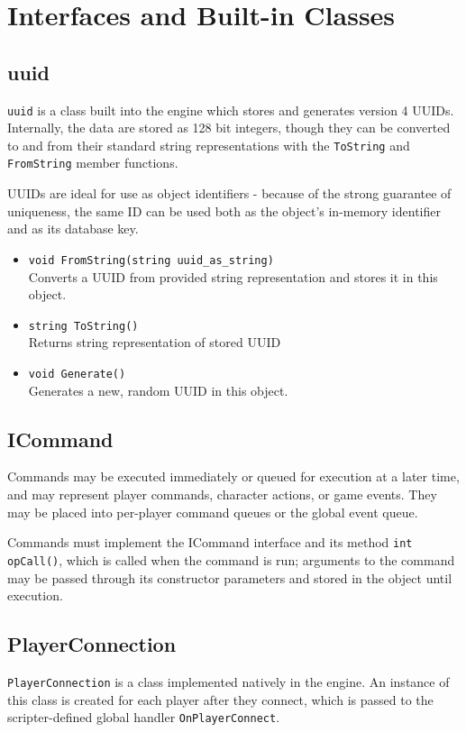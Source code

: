 \documentclass{book}
\begin{document}
\section{Interfaces and Built-in Classes}
\subsection{uuid}

\texttt{uuid} is a class built into the engine which stores and generates
version 4 UUIDs.  Internally, the data are stored as 128 bit integers, though
they can be converted to and from their standard string representations with the
\texttt{ToString} and \texttt{FromString} member functions.

UUIDs are ideal for use as object identifiers - because of the strong guarantee
of uniqueness, the same ID can be used both as the object's in-memory identifier
and as its database key.

\begin{itemize}
\item \texttt{void FromString(string uuid\_as\_string)}\\
Converts a UUID from provided string representation and stores it in this object.

\item \texttt{string ToString()}\\
Returns string representation of stored UUID

\item \texttt{void Generate()}\\
Generates a new, random UUID in this object.

\end{itemize}

\subsection{ICommand}

Commands may be executed immediately or queued for execution at a later time,
and may represent player commands, character actions, or game events. They may
be placed into per-player command queues or the global event queue.

Commands must implement the ICommand interface and its method \texttt{int
  opCall()}, which is called when the command is run; arguments to the command
may be passed through its constructor parameters and stored in the object until
execution.

\subsection{PlayerConnection}
\texttt{PlayerConnection} is a class implemented natively in the engine. An
instance of this class is created for each player after they connect, which is
passed to the scripter-defined global handler \texttt{OnPlayerConnect}.
\end{document}
